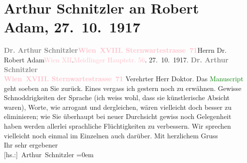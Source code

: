 

               \section[Arthur Schnitzler an Robert Adam, 27. 10. 1917]{ Arthur Schnitzler an Robert Adam, 27. 10. 1917}\nopagebreak{}\rehead{ }\normalsize\beginnumbering{} \toendnotes[C]{\smallbreak\pagebreak[2]} 
\toendnotes[C]{\smallbreak}\pstart{}{\pb}\textcolor{gray}{\textbf{Dr. Arthur Schnitzler}}\pend{}\pstart{}\textcolor{gray}{\textbf{\textcolor{pink}{Wien XVIII. Sternwartestrasse 71}{}\ledrightnote{\textcolor{pink}{Sternwartestraße}}}}\pend{}{\bigskip}\pstart{}{\pb}Herrn Dr. Robert Adam\pend{}\pstart{}\textcolor{pink}{Wien XII}{}\ledrightnote{\textcolor{pink}{XII., Meidling}}.\pend{}\pstart{}\textcolor{pink}{Meidlinger Hauptstr. 56}{}\ledrightnote{\textcolor{pink}{Meidlinger Hauptstraße}}.\pend{}{\bigskip}\pstart
           \raggedleft{}{\pb}27. 10. 1917.\pend
           \pstart
           \textcolor{gray}{\textbf{Dr. Arthur Schnitzler}}{\\}\textcolor{gray}{\textbf{\textcolor{pink}{Wien XVIII. Sternwartestrasse 71}{}\ledrightnote{\textcolor{pink}{Sternwartestraße}}}}\pend
           \pstart\center{}Verehrter Herr Doktor.\pend\pstart
           Das \textcolor{green}{Manuscript}{} geht soeben an
                    Sie zurück. Eines vergass ich gestern noch zu erwähnen. Gewisse Schnoddrigkeiten
                    der Sprache (ich weiss wohl, dass sie künstlerische Absicht waren), Worte, wie
                    arrogant und dergleichen, wären vielleicht doch besser zu eliminieren; wie Sie
                    überhaupt bei neuer Durchsicht gewiss noch Gelegenheit haben werden allerlei
                    sprachliche Flüchtigkeiten zu verbessern. Wir sprechen vielleicht noch einmal im
                    Einzelnen auch darüber.\pend
           \pstart
           Mit herzlichem Gruss{\\[\baselineskip]}Ihr sehr ergebener{\\[\baselineskip]}\spacefill\mbox{{[}hs.:{]} Arthur Schnitzler}\pend
           \leftskip=0em{}\endnumbering{}  
      